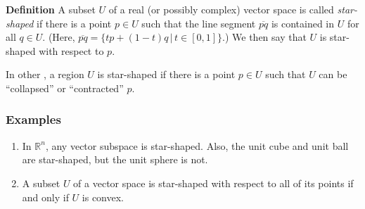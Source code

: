\documentclass[12pt]{article}
\newcommand{\sR}[0]{\mathbb{R}}
\begin{document}
{\bf Definition}
A subset $U$ of a real (or possibly complex) vector space is called 
\emph{star-shaped} if there is a point $p\in U$ such that the line segment
$\overline{pq}$ is contained in $U$ for all $q\in U$. (Here, $\overline{pq} = \{ tp + (1-t)q\, | \, t\in[0,1] \}$.)  We then say that $U$ is star-shaped with respect to $p$.

In other , a region $U$ is star-shaped if there is a point $p\in U$ such that $U$ can be ``collapsed'' or ``contracted''  $p$.

\subsubsection{Examples}
\begin{enumerate}
\item In $\sR^n$, any vector subspace is star-shaped. Also, the unit cube and 
unit ball are star-shaped, but the unit sphere is not. 
\item A subset $U$ of a vector space is star-shaped with respect to all of its points if and only if $U$ is convex. 
\end{enumerate}
\end{document}
